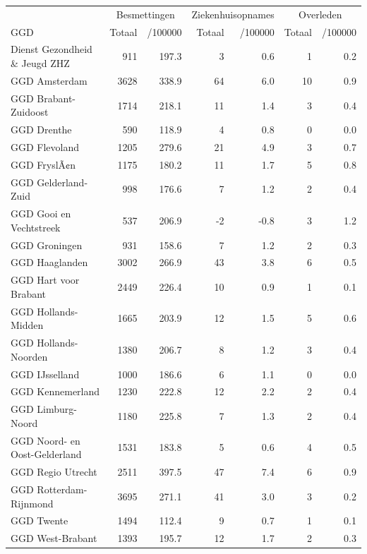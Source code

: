 \documentclass[
  english,
  man,floatsintext]{apa6}
\begin{document}
\begin{table}
\centering\begingroup\fontsize{10}{12}\selectfont

\begin{threeparttable}
\begin{tabular}{lrrrrrr}
\toprule
\multicolumn{1}{c}{ } & \multicolumn{2}{c}{Besmettingen} & \multicolumn{2}{c}{Ziekenhuisopnames} & \multicolumn{2}{c}{Overleden} \\
\cmidrule(l{3pt}r{3pt}){2-3} \cmidrule(l{3pt}r{3pt}){4-5} \cmidrule(l{3pt}r{3pt}){6-7}
GGD & Totaal & /100000 & Totaal & /100000 & Totaal & /100000\\
\midrule
Dienst Gezondheid \& Jeugd ZHZ & 911 & 197.3 & 3 & 0.6 & 1 & 0.2\\
GGD Amsterdam & 3628 & 338.9 & 64 & 6.0 & 10 & 0.9\\
GGD Brabant-Zuidoost & 1714 & 218.1 & 11 & 1.4 & 3 & 0.4\\
GGD Drenthe & 590 & 118.9 & 4 & 0.8 & 0 & 0.0\\
GGD Flevoland & 1205 & 279.6 & 21 & 4.9 & 3 & 0.7\\
GGD FryslÃ¢n & 1175 & 180.2 & 11 & 1.7 & 5 & 0.8\\
GGD Gelderland-Zuid & 998 & 176.6 & 7 & 1.2 & 2 & 0.4\\
GGD Gooi en Vechtstreek & 537 & 206.9 & -2 & -0.8 & 3 & 1.2\\
GGD Groningen & 931 & 158.6 & 7 & 1.2 & 2 & 0.3\\
GGD Haaglanden & 3002 & 266.9 & 43 & 3.8 & 6 & 0.5\\
GGD Hart voor Brabant & 2449 & 226.4 & 10 & 0.9 & 1 & 0.1\\
GGD Hollands-Midden & 1665 & 203.9 & 12 & 1.5 & 5 & 0.6\\
GGD Hollands-Noorden & 1380 & 206.7 & 8 & 1.2 & 3 & 0.4\\
GGD IJsselland & 1000 & 186.6 & 6 & 1.1 & 0 & 0.0\\
GGD Kennemerland & 1230 & 222.8 & 12 & 2.2 & 2 & 0.4\\
GGD Limburg-Noord & 1180 & 225.8 & 7 & 1.3 & 2 & 0.4\\
GGD Noord- en Oost-Gelderland & 1531 & 183.8 & 5 & 0.6 & 4 & 0.5\\
GGD Regio Utrecht & 2511 & 397.5 & 47 & 7.4 & 6 & 0.9\\
GGD Rotterdam-Rijnmond & 3695 & 271.1 & 41 & 3.0 & 3 & 0.2\\
GGD Twente & 1494 & 112.4 & 9 & 0.7 & 1 & 0.1\\
GGD West-Brabant & 1393 & 195.7 & 12 & 1.7 & 2 & 0.3\\

\end{tabular}
\end{threeparttable}
\end{table}
\end{document}
